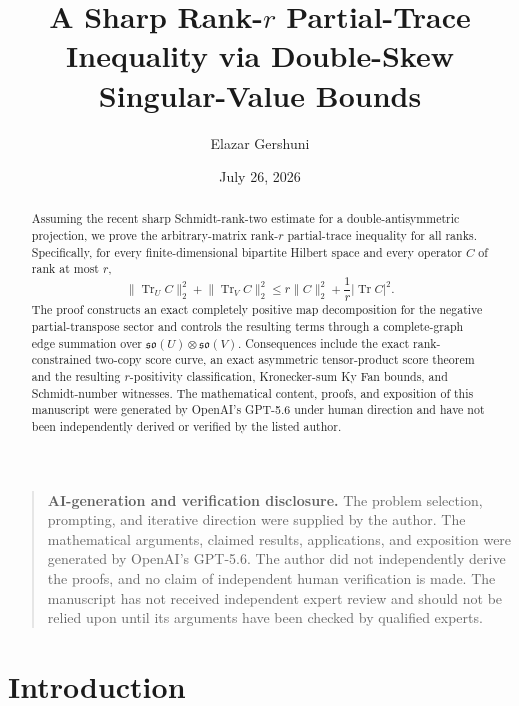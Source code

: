 \documentclass[11pt,reqno]{amsart}
\title[A Sharp Rank-$r$ Partial-Trace Inequality]
{A Sharp Rank-$r$ Partial-Trace Inequality via Double-Skew Singular-Value Bounds}
\author{Elazar Gershuni}
\date{July 26, 2026}
\theoremstyle{remark}
\DeclareMathOperator{\Tr}{Tr}
\newcommand{\norm}[1]{\lVert #1\rVert}
\newcommand{\abs}[1]{\lvert #1\rvert}
\begin{document}
\begin{abstract}
Assuming the recent sharp Schmidt-rank-two estimate for a
double-antisymmetric projection, we prove the arbitrary-matrix
rank-$r$ partial-trace inequality for all
ranks. Specifically, for every finite-dimensional bipartite Hilbert
space and every operator $C$ of rank at most $r$,
\[
    \norm{\Tr_U C}_2^2+\norm{\Tr_V C}_2^2
    \le r\norm{C}_2^2+\frac{1}{r}\abs{\Tr C}^2.
\]
The proof constructs an exact completely positive map decomposition for
the negative partial-transpose sector and controls the resulting terms
through a complete-graph edge summation over
$\mathfrak{so}(U)\otimes\mathfrak{so}(V)$. Consequences include the
exact rank-constrained two-copy score curve, an exact asymmetric
tensor-product score theorem and the resulting $r$-positivity
classification, Kronecker-sum Ky Fan bounds, and Schmidt-number
witnesses. The mathematical content, proofs, and
exposition of this manuscript were generated by OpenAI's GPT-5.6 under
human direction and have not been independently derived or verified by
the listed author.
\end{abstract}

\maketitle

\begin{quote}\small
\textbf{AI-generation and verification disclosure.}
The problem selection, prompting, and iterative direction were supplied
by the author. The mathematical arguments, claimed results,
applications, and exposition were generated by OpenAI's GPT-5.6.
The author did not independently derive the proofs, and no claim of
independent human verification is made. The manuscript has not received independent expert review and should not
be relied upon until its arguments have been checked by qualified experts.
\end{quote}

\section{Introduction}
\end{document}
